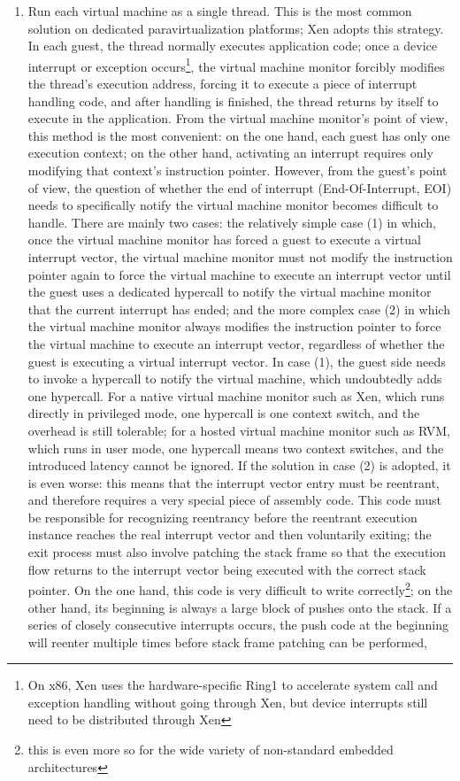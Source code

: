 \begin{enumerate}
\def\labelenumi{{[}\arabic{enumi}{]}}
\item
  Run each virtual machine as a single thread. This is the most common solution on dedicated paravirtualization platforms; Xen adopts this strategy. In each guest, the thread normally executes application code; once a device interrupt or exception occurs\footnote{On x86, Xen uses the hardware-specific Ring1 to accelerate system call and exception handling without going through Xen, but device interrupts still need to be distributed through Xen}, the virtual machine monitor forcibly modifies the thread's execution address, forcing it to execute a piece of interrupt handling code, and after handling is finished, the thread returns by itself to execute in the application. From the virtual machine monitor's point of view, this method is the most convenient: on the one hand, each guest has only one execution context; on the other hand, activating an interrupt requires only modifying that context's instruction pointer. However, from the guest's point of view, the question of whether the end of interrupt (End-Of-Interrupt, EOI) needs to specifically notify the virtual machine monitor becomes difficult to handle. There are mainly two cases: the relatively simple case (1) in which, once the virtual machine monitor has forced a guest to execute a virtual interrupt vector, the virtual machine monitor must not modify the instruction pointer again to force the virtual machine to execute an interrupt vector until the guest uses a dedicated hypercall to notify the virtual machine monitor that the current interrupt has ended; and the more complex case (2) in which the virtual machine monitor always modifies the instruction pointer to force the virtual machine to execute an interrupt vector, regardless of whether the guest is executing a virtual interrupt vector. In case (1), the guest side needs to invoke a hypercall to notify the virtual machine, which undoubtedly adds one hypercall. For a native virtual machine monitor such as Xen, which runs directly in privileged mode, one hypercall is one context switch, and the overhead is still tolerable; for a hosted virtual machine monitor such as RVM, which runs in user mode, one hypercall means two context switches, and the introduced latency cannot be ignored. If the solution in case (2) is adopted, it is even worse: this means that the interrupt vector entry must be reentrant, and therefore requires a very special piece of assembly code. This code must be responsible for recognizing reentrancy before the reentrant execution instance reaches the real interrupt vector and then voluntarily exiting; the exit process must also involve patching the stack frame so that the execution flow returns to the interrupt vector being executed with the correct stack pointer. On the one hand, this code is very difficult to write correctly\footnote{this is even more so for the wide variety of non-standard embedded architectures}; on the other hand, its beginning is always a large block of pushes onto the stack. If a series of closely consecutive interrupts occurs, the push code at the beginning will reenter multiple times before stack frame patching can be performed, 
\end{enumerate}
